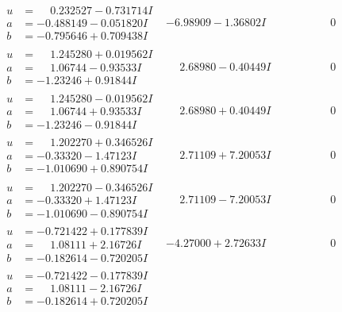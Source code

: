 \documentclass[1p]{elsarticle_modified}
\theoremstyle{definition}
\begin{document}
$$\begin{array}{c|c|c}
 \hline 
\begin{aligned}
u &= \phantom{-}0.232527 - 0.731714 I \\
a &= -0.488149 - 0.051820 I \\
b &= -0.795646 + 0.709438 I\end{aligned}
 & -6.98909 - 1.36802 I & \phantom{-0.000000 } 0 \\ \hline\begin{aligned}
u &= \phantom{-}1.245280 + 0.019562 I \\
a &= \phantom{-}1.06744 - 0.93533 I \\
b &= -1.23246 + 0.91844 I\end{aligned}
 & \phantom{-}2.68980 - 0.40449 I & \phantom{-0.000000 } 0 \\ \hline\begin{aligned}
u &= \phantom{-}1.245280 - 0.019562 I \\
a &= \phantom{-}1.06744 + 0.93533 I \\
b &= -1.23246 - 0.91844 I\end{aligned}
 & \phantom{-}2.68980 + 0.40449 I & \phantom{-0.000000 } 0 \\ \hline\begin{aligned}
u &= \phantom{-}1.202270 + 0.346526 I \\
a &= -0.33320 - 1.47123 I \\
b &= -1.010690 + 0.890754 I\end{aligned}
 & \phantom{-}2.71109 + 7.20053 I & \phantom{-0.000000 } 0 \\ \hline\begin{aligned}
u &= \phantom{-}1.202270 - 0.346526 I \\
a &= -0.33320 + 1.47123 I \\
b &= -1.010690 - 0.890754 I\end{aligned}
 & \phantom{-}2.71109 - 7.20053 I & \phantom{-0.000000 } 0 \\ \hline\begin{aligned}
u &= -0.721422 + 0.177839 I \\
a &= \phantom{-}1.08111 + 2.16726 I \\
b &= -0.182614 - 0.720205 I\end{aligned}
 & -4.27000 + 2.72633 I & \phantom{-0.000000 } 0 \\ \hline\begin{aligned}
u &= -0.721422 - 0.177839 I \\
a &= \phantom{-}1.08111 - 2.16726 I \\
b &= -0.182614 + 0.720205 I\end{aligned}

\end{array}$$
\end{document}
